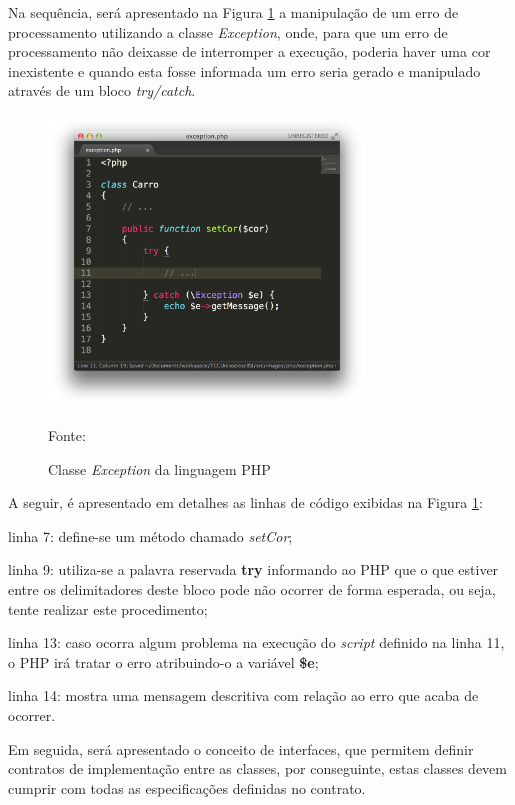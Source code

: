\FloatBarrier 	%


Na sequência, será apresentado na Figura \ref{fig:excecao} a manipulação de um
erro de processamento utilizando a classe \textit{Exception}, onde, para que
um erro de processamento não deixasse de interromper a execução, poderia haver
uma cor inexistente e quando esta fosse informada um erro seria gerado e 
manipulado através de um bloco \textit{try/catch}.

\begin{figure}[h!tb]
	\caption{Classe \textit{Exception} da linguagem PHP}
	\label{fig:excecao}

	\centering
	\includegraphics[width=0.75\textwidth]{images/exception.png}

	\centering
	\footnotesize Fonte: \fonteOAutor
\end{figure}

\FloatBarrier 	%

A seguir, é apresentado em detalhes as linhas de código exibidas na Figura
\ref{fig:excecao}:

\begin{alineas}
    \item linha 7: define-se um método chamado \textit{setCor};
    \item linha 9: utiliza-se a palavra reservada \textbf{try} informando ao
    \acs{PHP} que o que estiver entre os delimitadores deste bloco pode não
    ocorrer de forma esperada, ou seja, tente realizar este procedimento;
    \item linha 13: caso ocorra algum problema na execução do \textit{script}
    definido na linha 11, o \acs{PHP} irá tratar o erro atribuindo-o a variável
    \textbf{\$e};
    \item linha 14: mostra uma mensagem descritiva com relação ao erro que acaba
    de ocorrer.
\end{alineas}

Em seguida, será apresentado o conceito de interfaces, que permitem definir
contratos de implementação entre as classes, por conseguinte, estas classes
devem cumprir com todas as especificações definidas no contrato.
